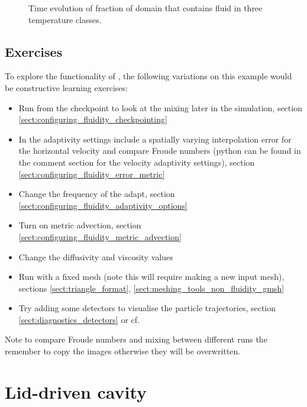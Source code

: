 \begin{figure}[ht]
  \centering
  \caption{Time evolution of fraction of domain that contains fluid in three temperature classes.}
  \label{fig:lock_exchange_mixing}
\end{figure}

\subsection{Exercises}
\label{sect:le_exercises}
To explore the functionality of \fluidity, the following variations on this example would be constructive learning exercises:
\begin{itemize}
\item Run from the checkpoint to look at the mixing later in the simulation, section \ref{sect:configuring_fluidity_checkpointing}
\item In the adaptivity settings include a spatially varying interpolation error for the horizontal velocity and compare Froude numbers (python can be found in the comment section for the velocity adaptivity settings), section \ref{sect:configuring_fluidity_error_metric}
\item Change the frequency of the adapt, section \ref{sect:configuring_fluidity_adaptivity_options}
\item Turn on metric advection, section \ref{sect:configuring_fluidity_metric_advection}
\item Change the diffusivity and viscosity values
\item Run with a fixed mesh (note this will require making a new input mesh), sections \ref{sect:triangle_format}, \ref{sect:meshing_tools_non_fluidity_gmsh}
\item Try adding some detectors to visualise the particle trajectories, section \ref{sect:diagnostics_detectors} or \newline cf. 
\end{itemize}
Note to compare Froude numbers and mixing between different runs the remember to copy the images otherwise they will be overwritten.


\section{Lid-driven cavity}
\label{sect:lid_driven_cavity}

